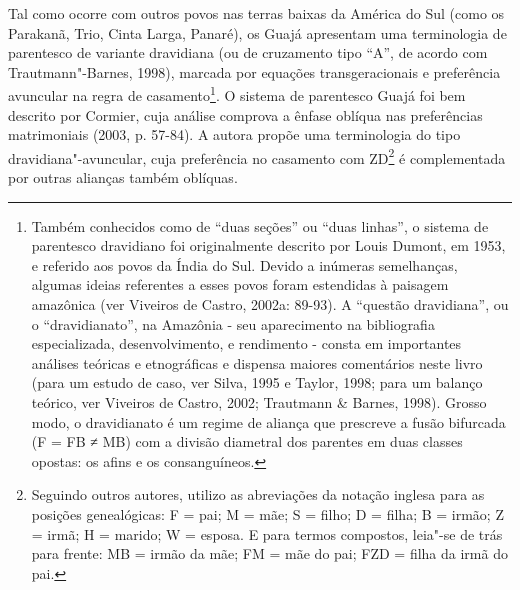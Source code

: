 Tal como ocorre com outros povos nas terras baixas da América do Sul
(como os Parakanã, Trio, Cinta Larga, Panaré), os Guajá apresentam uma
terminologia de parentesco de variante dravidiana (ou de cruzamento tipo
``A'', de acordo com Trautmann"-Barnes, 1998), marcada por equações
transgeracionais e preferência avuncular na regra de casamento\footnote{Também
  conhecidos como de ``duas seções'' ou ``duas linhas'', o sistema de
  parentesco dravidiano foi originalmente descrito por Louis Dumont, em
  1953, e referido aos povos da Índia do Sul. Devido a inúmeras
  semelhanças, algumas ideias referentes a esses povos foram estendidas
  à paisagem amazônica (ver Viveiros de Castro, 2002a: 89-93). A
  ``questão dravidiana'', ou o ``dravidianato'', na Amazônia - seu
  aparecimento na bibliografia especializada, desenvolvimento, e
  rendimento - consta em importantes análises teóricas e etnográficas e
  dispensa maiores comentários neste livro (para um estudo de caso, ver
  Silva, 1995 e Taylor, 1998; para um balanço teórico, ver Viveiros de
  Castro, 2002; Trautmann \& Barnes, 1998). Grosso modo, o dravidianato
  é um regime de aliança que prescreve a fusão bifurcada (F = FB ≠ MB)
  com a divisão diametral dos parentes em duas classes opostas: os afins
  e os consanguíneos.}. O sistema de parentesco Guajá foi bem descrito
por Cormier, cuja análise comprova a ênfase oblíqua nas preferências
matrimoniais (2003, p. 57-84). A autora propõe uma terminologia do tipo
dravidiana"-avuncular, cuja preferência no casamento com ZD\footnote{Seguindo
  outros autores, utilizo as abreviações da notação inglesa para as
  posições genealógicas: F = pai; M = mãe; S = filho; D = filha; B =
  irmão; Z = irmã; H = marido; W = esposa. E para termos compostos,
  leia"-se de trás para frente: MB = irmão da mãe; FM = mãe do pai; FZD =
  filha da irmã do pai.} é complementada por outras alianças também
oblíquas.

